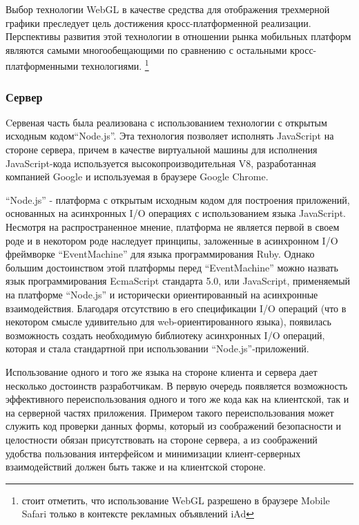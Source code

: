 \documentclass[12pt, a4paper]{article}
\begin{document}
Выбор технологии WebGL в качестве средства для отображения трехмерной графики
преследует цель достижения кросс-платформенной реализации. Перспективы развития
этой технологии в отношении рынка мобильных платформ являются самыми
многообещающими по сравнению с остальными кросс-платформенными технологиями.
\footnote{стоит отметить, что использование WebGL разрешено в браузере Mobile
Safari только в контексте рекламных объявлений iAd}

\subsubsection{Сервер}

Cервеная часть была реализована с использованием технологии с открытым исходным
кодом``Node.js''. Эта технология позволяет исполнять JavaScript на стороне
сервера, причем в качестве виртуальной машины для исполнения JavaScript-кода
используется высокопроизводительная V8, разработанная компанией Google и
используемая в браузере Google Chrome.

``Node.js'' - платформа с открытым исходным кодом для построения приложений,
основанных на асинхронных I/O операциях с использованием языка JavaScript.
Несмотря на распространенное мнение, платформа не является первой в своем роде и
в некотором роде наследует принципы, заложенные в асинхронном I/O фреймворке
``EventMachine'' для языка программирования Ruby. Однако большим достоинством
этой платформы перед ``EventMachine'' можно назвать язык программирования
EcmaScript стандарта 5.0, или JavaScript, применяемый на платформе ``Node.js'' и
исторически ориентированный на асинхронные взаимодействия.  Благодаря отсутствию
в его спецификации I/O операций (что в некотором смысле удивительно для
web-ориентированного языка), появилась возможность создать необходимую
библиотеку асинхронных I/O операций, которая и стала стандартной при
использовании ``Node.js''-приложений.

Использование одного и того же языка на стороне клиента и сервера дает несколько
достоинств разработчикам. В первую очередь появляется возможность эффективного
переиспользования одного и того же кода как на клиентской, так и на серверной
частях приложения. Примером такого переиспользования может служить
код проверки данных формы, который из соображений безопасности и целостности
обязан присутствовать на стороне сервера, а из соображений удобства пользования
интерфейсом и минимизации клиент-серверных взаимодействий должен быть также и на
клиентской стороне.
\end{document}
